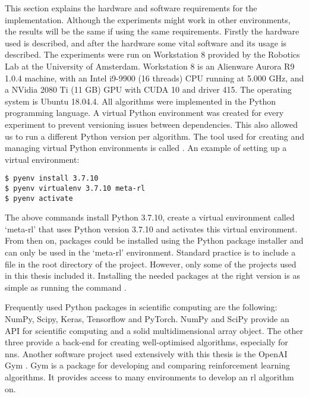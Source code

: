This section explains the hardware and software requirements for the
implementation. Although the experiments might work in other environments, the
results will be the same if using the same requirements. Firstly the hardware
used is described, and after the hardware some vital software and its usage is
described. The experiments were run on Workstation 8 provided by the Robotics
Lab at the University of Amsterdam. Workstation 8 is an Alienware Aurora R9
1.0.4 machine, with an Intel i9-9900 (16 threads) CPU running at 5.000 GHz,
and a NVidia 2080 Ti (11 GB) GPU with CUDA 10 and driver 415. The operating
system is Ubuntu 18.04.4. All algorithms were implemented in the Python
programming language. A virtual Python environment was
created for every experiment to prevent versioning issues between
dependencies. This also allowed us to run a different Python version per
algorithm. The tool used for creating and managing virtual Python environments
is called . An example of setting
up a virtual environment:

\begin{verbatim}
$ pyenv install 3.7.10
$ pyenv virtualenv 3.7.10 meta-rl
$ pyenv activate
\end{verbatim}

The above commands install Python 3.7.10, create a virtual environment called
`meta-rl' that uses Python version 3.7.10 and activates this virtual
environment. From then on, packages could be installed using the Python
package installer  and can only be used in the `meta-rl'
environment. Standard practice is to include a  file in
the root directory of the project. However, only some of the projects used in
this thesis included it. Installing the needed packages at the right version
is as simple as running the command .

Frequently used Python packages in scientific computing are the following:
NumPy, Scipy, Keras, Tensorflow and PyTorch\footnotemark. NumPy and SciPy
provide an API for scientific computing and a solid multidimensional array
object. The other three provide a back-end for creating well-optimised \ml
algorithms, especially for \glspl{nn}. Another software project used extensively with
this thesis is the OpenAI Gym \cite{gym2016}. Gym is a package for developing
and comparing reinforcement learning algorithms. It provides access to many
environments to develop an \gls{rl} algorithm on.


